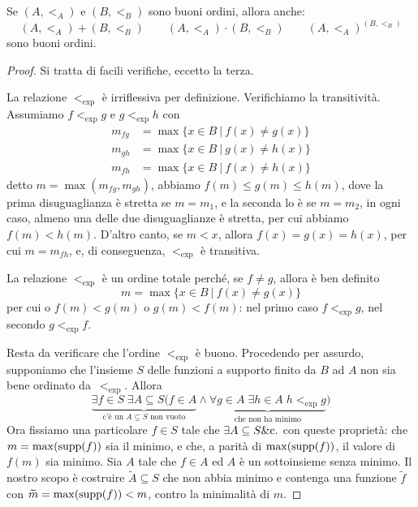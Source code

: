 \begin{proposition}
	Se $(A,<_A)$ e $(B,<_B)$ sono buoni ordini, allora anche:
	\[ (A,<_A) + (B,<_B) \qquad (A,<_A) \cdot (B,<_B) \qquad (A,<_A)^{(B,<_B)}
		\]
	sono buoni ordini.
\end{proposition}

\begin{proof}
	Si tratta di facili verifiche, {\drkred eccetto la terza.}

	La relazione $<_{\exp}$ \`e {\drkblu irriflessiva} per definizione.
Verifichiamo la {\drkblu transitivit\`a.}
	Assumiamo $f <_{\exp} g$ e $g <_{\exp} h$ con
	\begin{align*}
		m_{fg} &= \max \{x\in B\: |\: f(x) \ne g(x)\} \\
		m_{gh} &= \max \{x\in B\: |\: g(x) \ne h(x)\} \\
		m_{fh} &= \max \{x\in B\: |\: f(x) \ne h(x)\}
	\end{align*}
	detto $m = \max(m_{fg},m_{gh})$, abbiamo $f(m) \leq g(m) \leq
h(m)$, dove la prima disuguaglianza \`e stretta se $m = m_1$, e la seconda
lo \`e se $m = m_2$, in ogni caso, almeno una delle due disuguaglianze \`e
stretta, per cui abbiamo $f(m) < h(m)$.
	D'altro canto, se $m < x$, allora $f(x) = g(x) = h(x)$, per cui $m
= m_{fh}$, e, di conseguenza, $<_{\exp}$ \`e transitiva.

La relazione $<_{\exp}$ \`e un {\drkblu ordine totale} perch\'e, se $f \ne
g$, allora \`e ben definito
\[m = \max\{x \in B \:|\: f(x) \ne g(x)\}\]
per cui o $f(m)< g(m)$ o $g(m) < f(m)$: nel primo caso $f <_{\exp} g$, nel secondo $g <_{\exp} f$.

	Resta da verificare che {\drkblu l'ordine $<_{\exp}$ \`e buono.}
Procedendo per assurdo, supponiamo che l'insieme
$S$ delle funzioni a supporto finito da $B$ ad $A$ non sia bene ordinato
da~$<_{\exp}$. Allora
	\[ \underbrace{\exists {f \in S} \; \exists {A \subseteq S} (f \in
A}_{\text{c'\`e un $A \subseteq S$ non vuoto}}\land\underbrace{\forall {g
\in A} \; \exists {h \in A} \; h <_{\exp} g}_{\text{che non ha minimo}})
		\]
Ora fissiamo una particolare $f \in S$ tale che $\exists A \subseteq S
\text{\&c.}$ con queste propriet\`a:
	che $m=\max(\operatorname{supp}(f))$ sia il minimo, e che, a parit\`a di $\max(\operatorname{supp}(f))$, il valore di $f(m)$ sia minimo.
	Sia $A$ tale che $f \in A$ ed $A$ \`e un sottoinsieme senza minimo.
	Il nostro scopo \`e costruire $\widetilde{A} \subseteq S$ che non
abbia minimo e contenga una funzione $\widetilde{f}$ con $\widetilde{m} =
\max(\operatorname{supp}(f)) < m$, contro la minimalit\`a di $m$.


\end{proof}
